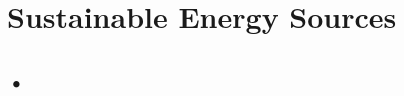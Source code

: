 \section{Sustainable Energy Sources}

\begin{multicols}{2}


\section*{•}





\end{multicols}

\pagebreak